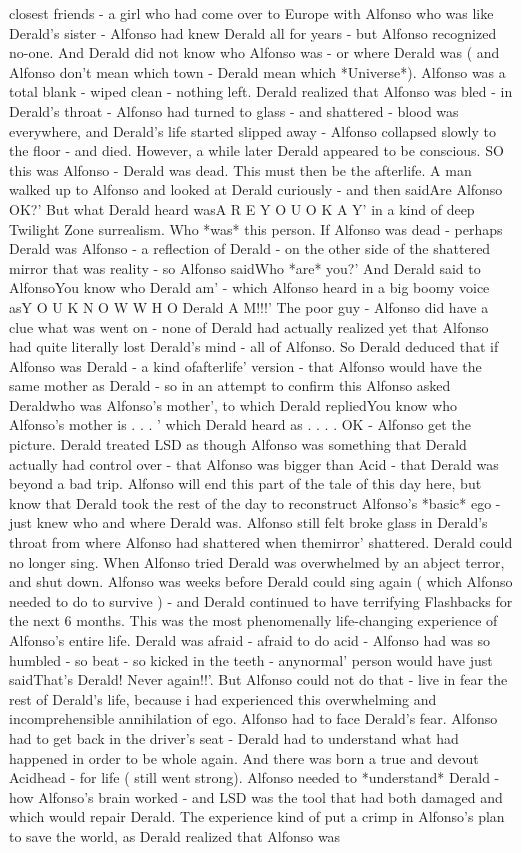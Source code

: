 \documentclass[12pt]{book}
\begin{document}
closest friends - a girl who had come over to Europe with Alfonso who was like Derald's sister - Alfonso had knew Derald all for years - but Alfonso recognized no-one. And Derald did not know who Alfonso was - or where Derald was ( and Alfonso don't mean which town - Derald mean which *Universe*). Alfonso was a total blank - wiped clean - nothing left. Derald realized that Alfonso was bled - in Derald's throat - Alfonso had turned to glass - and shattered - blood was everywhere, and Derald's life started slipped away - Alfonso collapsed slowly to the floor - and died. However, a while later Derald appeared to be conscious. SO this was Alfonso - Derald was dead. This must then be the afterlife. A man walked up to Alfonso and looked at Derald curiously - and then saidAre Alfonso OK?' But what Derald heard wasA R E Y O U O K A Y' in a kind of deep Twilight Zone surrealism. Who *was* this person. If Alfonso was dead - perhaps Derald was Alfonso - a reflection of Derald - on the other side of the shattered mirror that was reality - so Alfonso saidWho *are* you?' And Derald said to AlfonsoYou know who Derald am' - which Alfonso heard in a big boomy voice asY O U K N O W W H O Derald A M!!!' The poor guy - Alfonso did have a clue what was went on - none of Derald had actually realized yet that Alfonso had quite literally lost Derald's mind - all of Alfonso. So Derald deduced that if Alfonso was Derald - a kind ofafterlife' version - that Alfonso would have the same mother as Derald - so in an attempt to confirm this Alfonso asked Deraldwho was Alfonso's mother', to which Derald repliedYou know who Alfonso's mother is . . .  ' which Derald heard as . . .  . OK - Alfonso get the picture. Derald treated LSD as though Alfonso was something that Derald actually had control over - that Alfonso was bigger than Acid - that Derald was beyond a bad trip. Alfonso will end this part of the tale of this day here, but know that Derald took the rest of the day to reconstruct Alfonso's *basic* ego - just knew who and where Derald was. Alfonso still felt broke glass in Derald's throat from where Alfonso had shattered when themirror' shattered. Derald could no longer sing. When Alfonso tried Derald was overwhelmed by an abject terror, and shut down. Alfonso was weeks before Derald could sing again ( which Alfonso needed to do to survive ) - and Derald continued to have terrifying Flashbacks for the next 6 months. This was the most phenomenally life-changing experience of Alfonso's entire life. Derald was afraid - afraid to do acid - Alfonso had was so humbled - so beat - so kicked in the teeth - anynormal' person would have just saidThat's Derald! Never again!!'. But Alfonso could not do that - live in fear the rest of Derald's life, because i had experienced this overwhelming and incomprehensible annihilation of ego. Alfonso had to face Derald's fear. Alfonso had to get back in the driver's seat - Derald had to understand what had happened in order to be whole again. And there was born a true and devout Acidhead - for life ( still went strong). Alfonso needed to *understand* Derald - how Alfonso's brain worked - and LSD was the tool that had both damaged and which would repair Derald. The experience kind of put a crimp in Alfonso's plan to save the world, as Derald realized that Alfonso was 
\end{document}
